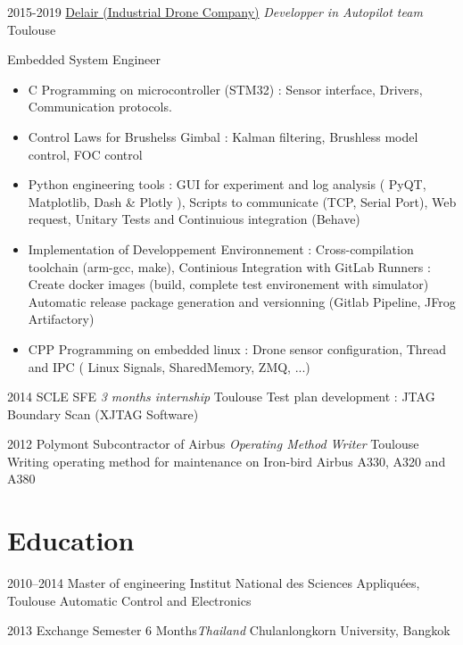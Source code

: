 \documentclass[a4paper]{friggeri-cv} %
\begin{document}
\begin{entrylist}
\entry
{2015-2019}
{\href{https://delair.aero}{Delair (Industrial Drone Company)} \textit{Developper in Autopilot team}}
{Toulouse}
{Embedded System Engineer
\begin{itemize}
\item C Programming on microcontroller (STM32) : Sensor interface, Drivers, Communication protocols.
\item Control Laws for Brushelss Gimbal : Kalman filtering, Brushless model control, FOC control
\item Python engineering tools : GUI for experiment and log analysis ( PyQT, Matplotlib, Dash \& Plotly ), Scripts to communicate (TCP, Serial Port), Web request, Unitary Tests and Continuious integration (Behave)
\item Implementation of Developpement Environnement : Cross-compilation toolchain (arm-gcc, make), Continious Integration with GitLab Runners : Create docker images (build, complete test environement with simulator) Automatic release package generation and versionning (Gitlab Pipeline, JFrog Artifactory)
\item CPP Programming on embedded linux : Drone sensor configuration, Thread and IPC (  Linux Signals, SharedMemory, ZMQ, ...)
\end{itemize}
%
}
\entry
{2014}
{SCLE SFE \textit{3 months internship}}
{Toulouse}
{Test plan development : JTAG Boundary Scan (XJTAG Software)
}

\entry
{2012}
{Polymont Subcontractor of Airbus \textit{Operating Method Writer}}
{Toulouse}
{ Writing operating method for maintenance on Iron-bird Airbus A330, A320 and A380 }


\end{entrylist}


\section{Education}
\begin{entrylist}

 \entry
{2010--2014}
{Master of engineering}
{Institut National des Sciences Appliquées, Toulouse}
{Automatic Control and Electronics}


\entry
{2013}
{Exchange Semester 6 Months\textit{Thailand}}
{Chulanlongkorn University, Bangkok}
{}



\end{entrylist}
\end{document}
